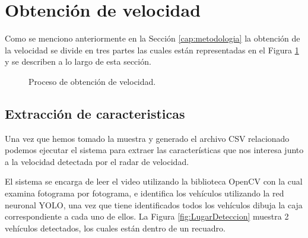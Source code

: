 \section{Obtención de velocidad}

Como se menciono anteriormente en la Sección \ref{cap:metodologia} la obtención de la velocidad se divide en tres partes las cuales están representadas en el Figura \ref{fig:DFObtencionDeVelocidad} y se describen a lo largo de esta sección.

\begin{figure}[H]
    \centering

    \caption{Proceso de obtención de velocidad.}
    \label{fig:DFObtencionDeVelocidad}
\end{figure}

\subsection{Extracción de caracteristicas }

Una vez que hemos tomado la muestra y generado el archivo CSV relacionado podemos ejecutar el sistema para extraer las características que nos interesa junto a la velocidad detectada por el radar de velocidad.

El sistema se encarga de leer el video utilizando la biblioteca OpenCV con la cual examina fotograma por fotograma, e identifica los vehículos utilizando la red neuronal YOLO, una vez que tiene identificados todos los vehículos dibuja la caja correspondiente a cada uno de ellos. La Figura \ref{fig:LugarDeteccion} muestra 2 vehículos detectados, los cuales están dentro de un recuadro.

